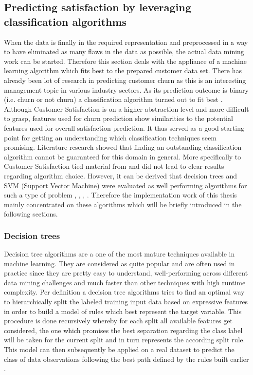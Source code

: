 \subsection{Predicting satisfaction by leveraging classification algorithms}
\label{ssec:classificationAlgorithms}
When the data is finally in the required representation and preprocessed in a way to have eliminated as many flaws in the data as possible, the actual data mining work can be started. Therefore this section deals with the appliance of a machine learning algorithm which fits best to the prepared customer data set. There has already been lot of research in predicting customer churn as this is an interesting management topic in various industry sectors. As its prediction outcome is binary (i.e. churn or not churn) a classification algorithm turned out to fit best \cite{vafeiadis2015comparison} \cite{xie2009customer}. Although Customer Satisfaction is on a higher abstraction level and more difficult to grasp, features used for churn prediction show similarities to the potential features used for overall satisfaction prediction. It thus served as a good starting point for getting an understanding which classification techniques seem promising. Literature research showed that finding an outstanding classification algorithm cannot be guaranteed for this domain in general. More specifically to Customer Satisfaction tied material from \cite{mozer2000predicting} and \cite{meinzer2016can} did not lead to clear results regarding algorithm choice. However, it can be derived that decision trees and SVM (Support Vector Machine) were evaluated as well performing algorithms for such a type of problem \cite{vafeiadis2015comparison}, \cite{xie2009customer}, \cite{mozer2000predicting}, \cite{meinzer2016can}. Therefore the implementation work of this thesis mainly concentrated on these algorithms which will be briefly introduced in the following sections.

\subsubsection{Decision trees}
Decision tree algorithms are a one of the most mature techniques available in machine learning. They are considered as quite popular and are often used in practice since they are pretty easy to understand, well-performing across different data mining challenges and much faster than other techniques with high runtime complexity. Per definition a decision tree algorithms tries to find an optimal way to hierarchically split the labeled training input data based on expressive features in order to build a model of rules which best represent the target variable. This procedure is done recursively whereby for each split all available features get considered, the one which promises the best separation regarding the class label will be taken for the current split and in turn represents the according split rule. This model can then subsequently be applied on a real dataset to predict the class of data observations following the best path defined by the rules built earlier \cite{linoff2011data}. 

